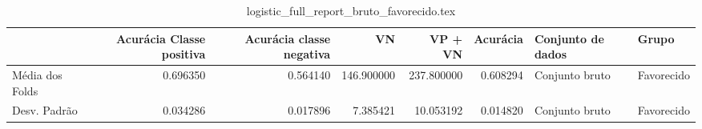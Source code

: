 \begin{table}
\centering
\caption{logistic_full_report_bruto_favorecido.tex}
\label{logistic_full_report_bruto_favorecido.tex}
\begin{tabular}{lrrrrrll}
\toprule
{} &  Acurácia Classe positiva &  Acurácia classe negativa &         VN  &    VP + VN  &  Acurácia & Conjunto de dados &       Grupo \\
\midrule
Média dos Folds &                  0.696350 &                  0.564140 &  146.900000 &  237.800000 &  0.608294 &    Conjunto bruto &  Favorecido \\
Desv. Padrão    &                  0.034286 &                  0.017896 &    7.385421 &   10.053192 &  0.014820 &    Conjunto bruto &  Favorecido \\
\bottomrule
\end{tabular}
\end{table}
